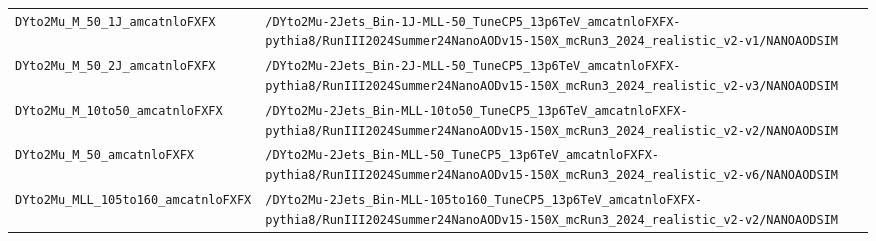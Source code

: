 \begin{longtable}{@{}>{\RaggedRight\arraybackslash}p{} >{\RaggedRight\arraybackslash}p{}@{}}
\addlinespace[2pt]
\texttt{DYto2Mu\_\allowbreak{}M\_\allowbreak{}50\_\allowbreak{}1J\_\allowbreak{}amcatnloFXFX} & \texttt{/\allowbreak{}DYto2Mu-\allowbreak{}2Jets\_\allowbreak{}Bin-\allowbreak{}1J-\allowbreak{}MLL-\allowbreak{}50\_\allowbreak{}TuneCP5\_\allowbreak{}13p6TeV\_\allowbreak{}amcatnloFXFX-\allowbreak{}pythia8/\allowbreak{}RunIII2024Summer24NanoAODv15-\allowbreak{}150X\_\allowbreak{}mcRun3\_\allowbreak{}2024\_\allowbreak{}realistic\_\allowbreak{}v2-\allowbreak{}v1/\allowbreak{}NANOAODSIM} \\
\addlinespace[2pt]
\texttt{DYto2Mu\_\allowbreak{}M\_\allowbreak{}50\_\allowbreak{}2J\_\allowbreak{}amcatnloFXFX} & \texttt{/\allowbreak{}DYto2Mu-\allowbreak{}2Jets\_\allowbreak{}Bin-\allowbreak{}2J-\allowbreak{}MLL-\allowbreak{}50\_\allowbreak{}TuneCP5\_\allowbreak{}13p6TeV\_\allowbreak{}amcatnloFXFX-\allowbreak{}pythia8/\allowbreak{}RunIII2024Summer24NanoAODv15-\allowbreak{}150X\_\allowbreak{}mcRun3\_\allowbreak{}2024\_\allowbreak{}realistic\_\allowbreak{}v2-\allowbreak{}v3/\allowbreak{}NANOAODSIM} \\
\addlinespace[2pt]
\texttt{DYto2Mu\_\allowbreak{}M\_\allowbreak{}10to50\_\allowbreak{}amcatnloFXFX} & \texttt{/\allowbreak{}DYto2Mu-\allowbreak{}2Jets\_\allowbreak{}Bin-\allowbreak{}MLL-\allowbreak{}10to50\_\allowbreak{}TuneCP5\_\allowbreak{}13p6TeV\_\allowbreak{}amcatnloFXFX-\allowbreak{}pythia8/\allowbreak{}RunIII2024Summer24NanoAODv15-\allowbreak{}150X\_\allowbreak{}mcRun3\_\allowbreak{}2024\_\allowbreak{}realistic\_\allowbreak{}v2-\allowbreak{}v2/\allowbreak{}NANOAODSIM} \\
\addlinespace[2pt]
\texttt{DYto2Mu\_\allowbreak{}M\_\allowbreak{}50\_\allowbreak{}amcatnloFXFX} & \texttt{/\allowbreak{}DYto2Mu-\allowbreak{}2Jets\_\allowbreak{}Bin-\allowbreak{}MLL-\allowbreak{}50\_\allowbreak{}TuneCP5\_\allowbreak{}13p6TeV\_\allowbreak{}amcatnloFXFX-\allowbreak{}pythia8/\allowbreak{}RunIII2024Summer24NanoAODv15-\allowbreak{}150X\_\allowbreak{}mcRun3\_\allowbreak{}2024\_\allowbreak{}realistic\_\allowbreak{}v2-\allowbreak{}v6/\allowbreak{}NANOAODSIM} \\
\addlinespace[2pt]
\texttt{DYto2Mu\_\allowbreak{}MLL\_\allowbreak{}105to160\_\allowbreak{}amcatnloFXFX} & \texttt{/\allowbreak{}DYto2Mu-\allowbreak{}2Jets\_\allowbreak{}Bin-\allowbreak{}MLL-\allowbreak{}105to160\_\allowbreak{}TuneCP5\_\allowbreak{}13p6TeV\_\allowbreak{}amcatnloFXFX-\allowbreak{}pythia8/\allowbreak{}RunIII2024Summer24NanoAODv15-\allowbreak{}150X\_\allowbreak{}mcRun3\_\allowbreak{}2024\_\allowbreak{}realistic\_\allowbreak{}v2-\allowbreak{}v2/\allowbreak{}NANOAODSIM} \\

\end{longtable}
